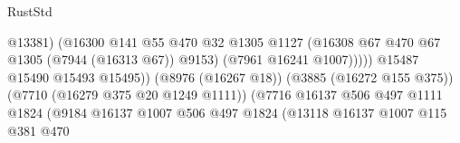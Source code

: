 \begin{lexlean}{RustStd}
\begin{coremodule}
                                                            @13381)
                                                          (@16300
                                                            @141
                                                            @55
                                                            @470
                                                            @32
                                                            @1305
                                                            @1127
                                                            (@16308
                                                              @67
                                                              @470
                                                              @67
                                                              @1305
                                                              (@7944 (@16313 @67))
                                                              @9153)
                                                            (@7961 @16241 @1007)))))
                                                    @15487
                                                    @15490
                                                    @15493
                                                    @15495))
                                                (@8976 (@16267 @18))
                                                (@3885 (@16272 @155 @375))
                                                (@7710 (@16279 @375 @20 @1249 @1111))
                                                (@7716
                                                  @16137
                                                  @506
                                                  @497
                                                  @1111
                                                  @1824
                                                  (@9184
                                                    @16137
                                                    @1007
                                                    @506
                                                    @497
                                                    @1824
                                                    (@13118
                                                      @16137
                                                      @1007
                                                      @115
                                                      @381
                                                      @470

\end{coremodule}
\end{lexlean}

